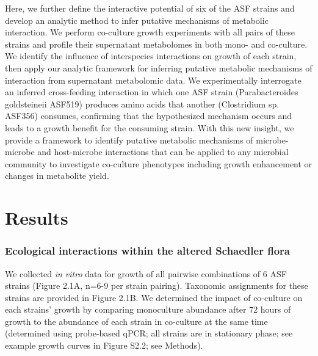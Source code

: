 \documentclass[11pt,twocolumn,notitlepage,openany,twoside]{book}
\begin{document}
\begin{refsection}
Here, we further define the interactive potential of six of the ASF strains and develop an analytic method to infer putative mechanisms of metabolic interaction. We perform co-culture growth experiments with all pairs of these strains and profile their supernatant metabolomes in both mono- and co-culture. We identify the influence of interspecies interactions on growth of each strain, then apply our analytic framework for inferring putative metabolic mechanisms of interaction from supernatant metabolomic data. We experimentally interrogate an inferred cross-feeding interaction in which one ASF strain (Parabacteroides goldsteineii ASF519) produces amino acids that another (Clostridium sp. ASF356) consumes, confirming that the hypothesized mechanism occurs and leads to a growth benefit for the consuming strain. With this new insight, we provide a framework to identify putative metabolic mechanisms of microbe-microbe and host-microbe interactions that can be applied to any microbial community to investigate co-culture phenotypes including growth enhancement or changes in metabolite yield.

\section{Results}
\subsubsection{Ecological interactions within the altered Schaedler flora}

We collected \textit{in vitro} data for growth of all pairwise combinations of 6 ASF strains (Figure 2.1A, n=6-9 per strain pairing). Taxonomic assignments for these strains are provided in Figure 2.1B. We determined the impact of co-culture on each strains’ growth by comparing monoculture abundance after 72 hours of growth to the abundance of each strain in co-culture at the same time (determined using probe-based qPCR; all strains are in stationary phase; see example growth curves in Figure S2.2; see Methods).


\end{refsection}
\end{document}
